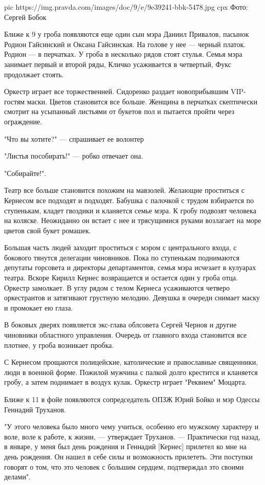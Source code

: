\ifcmt
pic https://img.pravda.com/images/doc/9/e/9e39241-bbk-5478.jpg
cpx Фото: Сергей Бобок
\fi

Ближе к 9 у гроба появляются еще один сын мэра Даниил Привалов, пасынок Родион
Гайсинский и Оксана Гайсинская. На голове у нее — черный платок. Родион — в
перчатках. У гроба в несколько рядов стоят стулья. Семья мэра занимает первый и
второй ряды, Кличко усаживается в четвертый, Фукс продолжает стоять.

Оркестр играет все торжественней. Сидоренко раздает новоприбывшим VIP-гостям
маски. Цветов становится все больше. Женщина в перчатках скептически смотрит на
усыпанный листьями от букетов пол и пытается пройти через ограждение.

"Что вы хотите?" — спрашивает ее волонтер

"Листья пособирать!" — робко отвечает она.

"Собирайте!".

Театр все больше становится похожим на мавзолей. Желающие проститься с Кернесом
все подходят и подходят. Бабушка с палочкой с трудом взбирается по ступенькам,
кладет гвоздики и кланяется семье мэра. К гробу подвозят человека на коляске.
Неожиданно он встает с нее и трясущимися руками возлагает на море цветов свой
букет ромашек.

Большая часть людей заходит проститься с мэром с центрального входа, с бокового
тянутся делегации чиновников. Пока по ступенькам поднимаются депутаты горсовета
и директоры департаментов, семья мэра исчезает в кулуарах театра. Вскоре Кирилл
Кернес возвращается и остается один у гроба отца. Оркестр замолкает. В углу
рядом с телом Кернеса усаживаются четверо оркестрантов и затягивают грустную
мелодию. Девушка в очереди снимает маску и промокает ею глаза.

В боковых дверях появляется экс-глава облсовета Сергей Чернов и другие
чиновники областного управления. Очередь от главного входа становится все
плотнее, у гроба возникает пробка. 

С Кернесом прощаются полицейские, католические и православные священники, люди
в военной форме. Пожилой мужчина с палкой долго крестится и кланяется гробу, а
затем поднимает в воздух кулак. Оркестр играет "Реквием" Моцарта.

Ближе к 11 в фойе появляются сопредседатель ОПЗЖ Юрий Бойко и мэр Одессы
Геннадий Труханов.

"У этого человека было много чему учиться, особенно его мужскому характеру и
воле, воле к работе, к жизни, — утверждает Труханов. — Практически год назад, в
январе, у меня был день рождения и Геннадий [Кернес] прилетел ко мне на день
рождения. Он нашел в себе силы и возможность прилететь. Эти поступки говорят о
том, что это человек с большим сердцем, подтверждал это своими делами".

